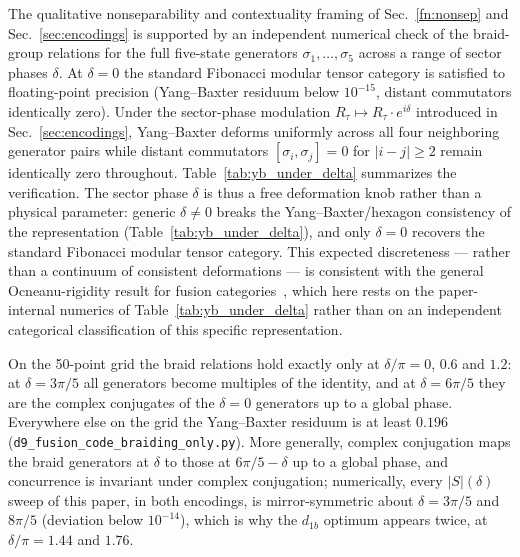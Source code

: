 \documentclass[aps,pra,twocolumn,superscriptaddress,longbibliography,floatfix,nofootinbib]{revtex4-2}
\begin{document}
The qualitative nonseparability and contextuality framing of Sec.~\ref{fn:nonsep} and
Sec.~\ref{sec:encodings} is supported by an independent numerical check
of the braid-group relations for the full five-state generators
$\sigma_1, \ldots, \sigma_5$ across a range of sector phases $\delta$.
At $\delta = 0$ the standard Fibonacci modular tensor category is
satisfied to floating-point precision (Yang--Baxter residuum below $10^{-15}$,
distant commutators identically zero).
Under the sector-phase modulation
$R_\tau \mapsto R_\tau \cdot e^{i\delta}$ introduced in
Sec.~\ref{sec:encodings}, Yang--Baxter deforms uniformly across
all four neighboring generator pairs while distant commutators
$[\sigma_i, \sigma_j] = 0$ for $|i-j| \geq 2$ remain identically zero
throughout. Table~\ref{tab:yb_under_delta} summarizes the verification.
The sector phase $\delta$ is thus a free deformation knob rather than a
physical parameter: generic $\delta \neq 0$ breaks the Yang--Baxter/hexagon
consistency of the representation (Table~\ref{tab:yb_under_delta}), and only
$\delta = 0$ recovers the standard Fibonacci modular tensor category. This
expected discreteness --- rather than a continuum of consistent deformations
--- is consistent with the general Ocneanu-rigidity result for fusion
categories~\cite{EtingofNikshychOstrik2002}, which here rests on the
paper-internal numerics of Table~\ref{tab:yb_under_delta} rather than on an
independent categorical classification of this specific representation.

On the 50-point grid the braid relations hold exactly only at
$\delta/\pi = 0$, $0.6$ and $1.2$: at $\delta = 3\pi/5$ all generators
become multiples of the identity, and at $\delta = 6\pi/5$ they are the
complex conjugates of the $\delta = 0$ generators up to a global phase.
Everywhere else on the grid the Yang--Baxter residuum is at least
$0.196$ (\texttt{d9\_fusion\_code\_braiding\_only.py}). More generally,
complex conjugation maps the braid generators at $\delta$ to those at
$6\pi/5 - \delta$ up to a global phase, and concurrence is invariant
under complex conjugation; numerically, every $|S|(\delta)$ sweep of
this paper, in both encodings, is mirror-symmetric about $\delta =
3\pi/5$ and $8\pi/5$ (deviation below $10^{-14}$), which is why the
$d_{1b}$ optimum appears twice, at $\delta/\pi = 1.44$ and $1.76$.
\end{document}
